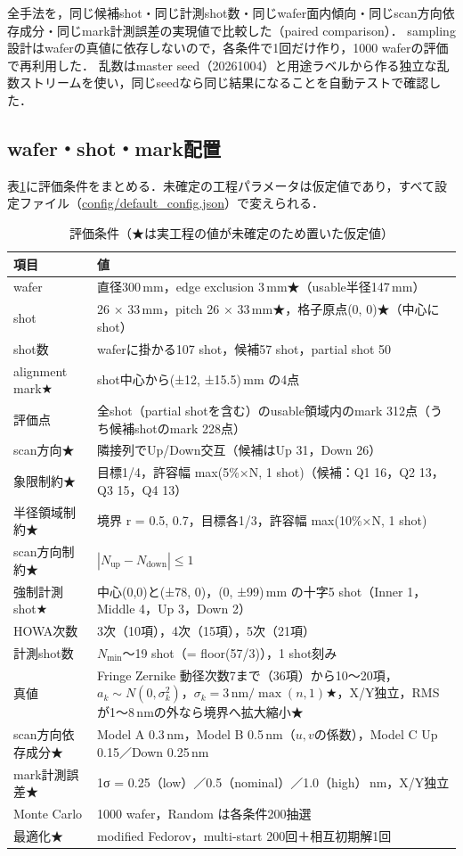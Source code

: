 \documentclass[10.5pt,a4paper]{ltjsarticle}
\newcommand{\nm}{\,\mathrm{nm}}
\begin{document}
全手法を，同じ候補shot・同じ計測shot数・同じwafer面内傾向・同じscan方向依存成分・同じmark計測誤差の実現値で比較した（paired comparison）．
sampling設計はwaferの真値に依存しないので，各条件で1回だけ作り，1000 waferの評価で再利用した．
乱数はmaster seed（20261004）と用途ラベルから作る独立な乱数ストリームを使い，同じseedなら同じ結果になることを自動テストで確認した．

\subsection{wafer・shot・mark配置}

表\ref{tab:assumptions}に評価条件をまとめる．未確定の工程パラメータは仮定値であり，すべて設定ファイル（\url{config/default_config.json}）で変えられる．

\begin{table}[htbp]
  \centering
  \caption{評価条件（★は実工程の値が未確定のため置いた仮定値）}
  \label{tab:assumptions}
  \small
  \begin{tabular}{p{45mm}p{110mm}}
    \toprule
    項目 & 値 \\
    \midrule
    wafer & 直径300\,mm，edge exclusion 3\,mm★（usable半径147\,mm） \\
    shot & 26 × 33\,mm，pitch 26 × 33\,mm★，格子原点(0, 0)★（中心にshot） \\
    shot数 & waferに掛かる107 shot，候補57 shot，partial shot 50 \\
    alignment mark★ & shot中心から(±12, ±15.5)\,mm の4点 \\
    評価点 & 全shot（partial shotを含む）のusable領域内のmark 312点（うち候補shotのmark 228点） \\
    scan方向★ & 隣接列でUp/Down交互（候補はUp 31，Down 26） \\
    象限制約★ & 目標1/4，許容幅 max(5\%×N, 1 shot)（候補：Q1 16，Q2 13，Q3 15，Q4 13） \\
    半径領域制約★ & 境界 r = 0.5, 0.7，目標各1/3，許容幅 max(10\%×N, 1 shot) \\
    scan方向制約★ & $|N_\text{up}-N_\text{down}|\le1$ \\
    強制計測shot★ & 中心(0,0)と(±78, 0)，(0, ±99)\,mm の十字5 shot（Inner 1，Middle 4，Up 3，Down 2） \\
    HOWA次数 & 3次（10項），4次（15項），5次（21項） \\
    計測shot数 & $N_\text{min}$〜19 shot（= floor(57/3)），1 shot刻み \\
    真値 & Fringe Zernike 動径次数7まで（36項）から10〜20項，$a_k\sim N(0,\sigma_k^2)$，$\sigma_k=3\nm/\max(n,1)$★，X/Y独立，RMSが1〜8\,nmの外なら境界へ拡大縮小★ \\
    scan方向依存成分★ & Model A 0.3\,nm，Model B 0.5\,nm（$u,v$の係数），Model C Up 0.15／Down 0.25\,nm \\
    mark計測誤差★ & 1σ = 0.25（low）／0.5（nominal）／1.0（high）\,nm，X/Y独立 \\
    Monte Carlo & 1000 wafer，Random は各条件200抽選 \\
    最適化★ & modified Fedorov，multi-start 200回＋相互初期解1回 \\
    \bottomrule
  \end{tabular}
\end{table}
\end{document}
